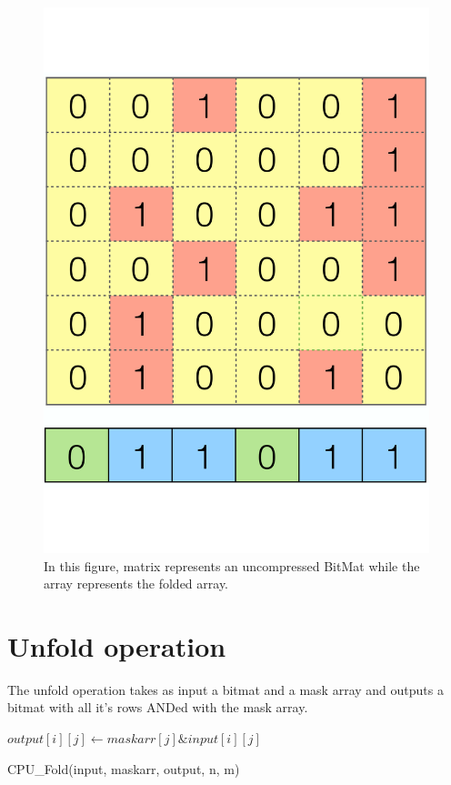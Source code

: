 \documentclass{article}
\begin{document}
\begin{figure}[ht]
        \includegraphics[width=.5\textwidth]{OR.pdf}
        \caption{In this figure, matrix represents an uncompressed BitMat while the array represents the folded array. }
        \centering
\end{figure}

\section*{Unfold operation}
The unfold operation takes as input a bitmat and a mask array and outputs a bitmat with all it's rows ANDed with the mask array.

\begin{algorithm}[H]
      \begin{algorithmic}[1]
                \STATE $output[i][j] \gets maskarr[j] \& input[i][j]$
            \ENDFOR
        \ENDFOR
      \end{algorithmic}
      \caption{CPU\_Fold(input, maskarr, output, n, m)}
\end{algorithm}
\end{document}
